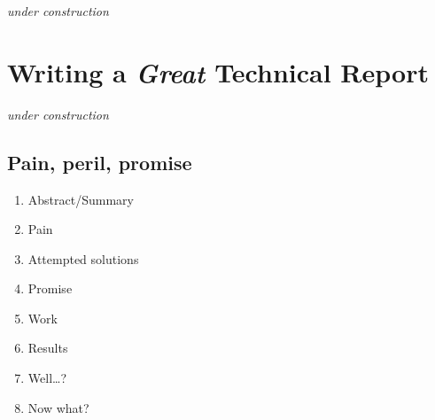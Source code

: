 \documentclass[
]{book}
\providecommand{\tightlist}{%
  \setlength{\itemsep}{0pt}\setlength{\parskip}{0pt}}
\begin{document}
\emph{under construction}

\hypertarget{writing-a-great-technical-report}{%
\chapter{\texorpdfstring{Writing a \textbf{\emph{Great}} Technical Report}{Writing a Great Technical Report}}\label{writing-a-great-technical-report}}

\emph{under construction}

\hypertarget{pain-peril-promise}{%
\section{Pain, peril, promise}\label{pain-peril-promise}}

\begin{enumerate}
\def\labelenumi{\arabic{enumi}.}
\tightlist
\item
  Abstract/Summary
\item
  Pain
\item
  Attempted solutions
\item
  Promise
\item
  Work
\item
  Results
\item
  Well\ldots?
\item
  Now what?
\end{enumerate}

  
\end{document}
